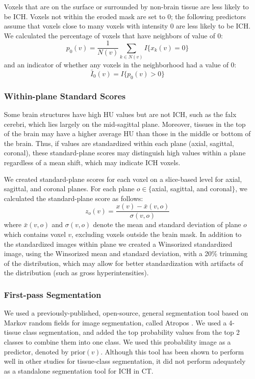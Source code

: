 \documentclass{elsarticle_nonatbib}\usepackage[]{graphicx}\usepackage[]{color}
\begin{document}
Voxels that are on the surface or surrounded by non-brain tissue are less likely to be ICH.  Voxels not within the eroded mask are set to $0$; the following predictors assume that voxels close to many voxels with intensity $0$ are less likely to be ICH.    
We calculated the percentage of voxels that have neighbors of value of $0$:
\begin{equation}
p_{0}(v) = \frac{1}{N(v)} \sum_{k \in N(v)} I\{ x_k(v) = 0 \} \label{eq:pct0}
\end{equation}
and an indicator of whether any voxels in the neighborhood had a value of $0$:
\begin{equation}
\bar{I}_{0}(v) = I\{ p_{0}(v) > 0 \} \label{eq:I0}
\end{equation}
 
\subsubsection{Within-plane Standard Scores} Some brain structures have high HU values but are not ICH, such as the falx cerebri, which lies largely on the mid-sagittal plane.  Moreover, tissues in the top of the brain may have a higher average HU than those in the middle or bottom of the brain.  Thus, if values are standardized within each plane (axial, sagittal, coronal), these standard-plane scores may distinguish high values within a plane regardless of a mean shift, which may indicate ICH voxels.

We created standard-plane scores for each voxel on a slice-based level for axial, sagittal, and coronal planes. For each plane $o \in \{$axial, sagittal, and coronal$\}$, we calculated the standard-plane score as follows: 
\begin{equation}
z_{o}(v) = \frac{x(v) - \bar{x}(v, o)}{\sigma(v, o)} \label{eq:z}
\end{equation}
where $\bar{x}(v, o)$ and $\sigma(v, o)$ denote the mean and standard deviation of plane $o$ which contains voxel $v$, excluding voxels outside the brain mask.   In addition to the standardized images within plane we created a Winsorized standardized image, using the Winsorized mean and standard deviation, with a 20\% trimming of the distribution, which may allow for better standardization with artifacts of the distribution (such as gross hyperintensities). 

\subsubsection{First-pass Segmentation} We used a previously-published, open-source, general segmentation tool based on Markov random fields for image segmentation, called Atropos \citep{atropos}.  We used a 4-tissue class segmentation, and added the top probability values from the top 2 classes to combine them into one class.  We used this probability image as a predictor, denoted by $\text{prior}(v)$.  Although this tool has been shown to perform well in other studies for tissue-class segmentation, it did not perform adequately as a standalone segmentation tool for ICH in CT.  
\end{document}
